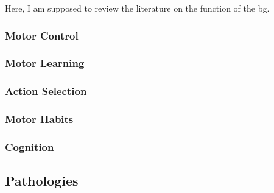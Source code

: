 Here, I am supposed to review the literature on the function of the \gls{bg}.

\subsubsection{Motor Control} \label{intro:motorControl}
\subsubsection{Motor Learning} \label{intro:motorLearning}
\subsubsection{Action Selection} \label{intro:actionSelection}
\subsubsection{Motor Habits} \label{intro:motorHabits}
\subsubsection{Cognition} \label{intro:bgCognition}

\subsection{Pathologies}
\label{intro:Motor:pathologies}
